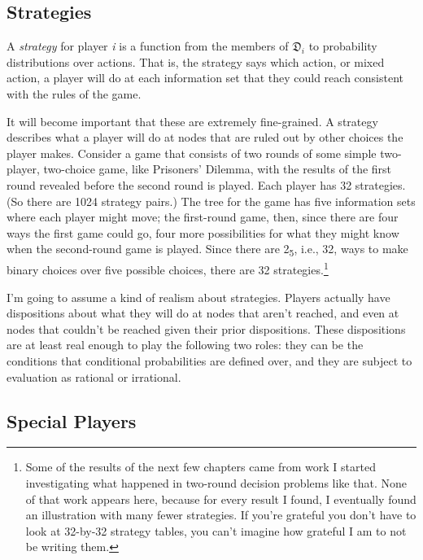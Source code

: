 \documentclass[
  12pt,
  letterpaper,
  DIV=11,
  numbers=noendperiod]{scrreprt}
\begin{document}
\hypertarget{sec-strategies}{%
\subsection{Strategies}\label{sec-strategies}}

A \emph{strategy} for player \emph{i} is a function from the members of
\(\mathfrak{D}_i\) to probability distributions over actions. That is,
the strategy says which action, or mixed action, a player will do at
each information set that they could reach consistent with the rules of
the game.

It will become important that these are extremely fine-grained. A
strategy describes what a player will do at nodes that are ruled out by
other choices the player makes. Consider a game that consists of two
rounds of some simple two-player, two-choice game, like Prisoners'
Dilemma, with the results of the first round revealed before the second
round is played. Each player has 32 strategies. (So there are 1024
strategy pairs.) The tree for the game has five information sets where
each player might move; the first-round game, then, since there are four
ways the first game could go, four more possibilities for what they
might know when the second-round game is played. Since there are
2\textsubscript{5}, i.e., 32, ways to make binary choices over five
possible choices, there are 32 strategies.\footnote{Some of the results
  of the next few chapters came from work I started investigating what
  happened in two-round decision problems like that. None of that work
  appears here, because for every result I found, I eventually found an
  illustration with many fewer strategies. If you're grateful you don't
  have to look at 32-by-32 strategy tables, you can't imagine how
  grateful I am to not be writing them.}

I'm going to assume a kind of realism about strategies. Players actually
have dispositions about what they will do at nodes that aren't reached,
and even at nodes that couldn't be reached given their prior
dispositions. These dispositions are at least real enough to play the
following two roles: they can be the conditions that conditional
probabilities are defined over, and they are subject to evaluation as
rational or irrational.

\hypertarget{sec-special-players}{%
\subsection{Special Players}\label{sec-special-players}}
\end{document}
